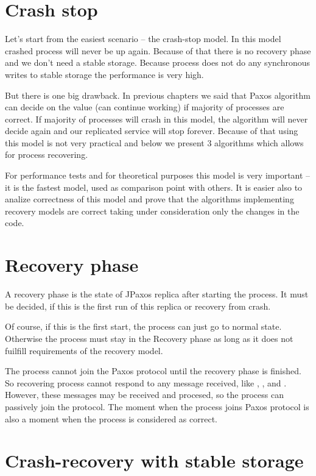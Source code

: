 \section{Crash stop}
\label{sec:crash_stop}

Let's start from the easiest scenario -- the crash-stop model. In this model crashed process will never be up again.
Because of that there is no recovery phase and we don't need a stable storage. Because process does not do any synchronous writes to stable storage the performance is very high. 

But there is one big drawback. In previous chapters we said that Paxos algorithm can decide on the value (can continue working) if majority of processes are correct. If majority of processes will crash in this model, the algorithm will never decide again and our replicated service will stop forever. Because of that using this model is not very practical and below we present 3 algorithms which allows for process recovering.

For performance tests and for theoretical purposes this model is very important -- it is the fastest model, used as comparison point with others. It is easier also to analize correctness of this model and prove that the algorithms implementing recovery models are correct taking under consideration only the changes in the code.

\section{Recovery phase}

A recovery phase is the state of JPaxos replica after starting the process. It must be decided, if this is the first run of this replica or recovery from crash.

Of course, if this is the first start, the process can just go to normal state. Otherwise the process must stay in the Recovery phase as long as it does not fuilfill requirements of the recovery model.

The process cannot join the Paxos protocol until the recovery phase is finished. So recovering process cannot respond to any message received, like \propose, \accept, \prepare and \prepareOK. However, these messages may be received and procesed, so the process can passively join the protocol. The moment when the process joins Paxos protocol is also a moment when the process is considered as correct.


\section{Crash-recovery with stable storage}
\label{sec:full_ss}

